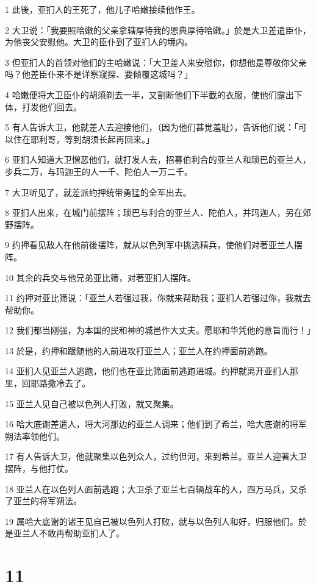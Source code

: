 \par 1 此後，亚扪人的王死了，他儿子哈嫩接续他作王。
\par 2 大卫说：「我要照哈嫩的父亲拿辖厚待我的恩典厚待哈嫩。」於是大卫差遣臣仆，为他丧父安慰他。大卫的臣仆到了亚扪人的境内。
\par 3 但亚扪人的首领对他们的主哈嫩说：「大卫差人来安慰你，你想他是尊敬你父亲吗？他差臣仆来不是详察窥探、要倾覆这城吗？」
\par 4 哈嫩便将大卫臣仆的胡须剃去一半，又割断他们下半截的衣服，使他们露出下体，打发他们回去。
\par 5 有人告诉大卫，他就差人去迎接他们，（因为他们甚觉羞耻），告诉他们说：「可以住在耶利哥，等到胡须长起再回来。」
\par 6 亚扪人知道大卫憎恶他们，就打发人去，招募伯利合的亚兰人和琐巴的亚兰人，步兵二万，与玛迦王的人一千、陀伯人一万二千。
\par 7 大卫听见了，就差派约押统带勇猛的全军出去。
\par 8 亚扪人出来，在城门前摆阵；琐巴与利合的亚兰人、陀伯人，并玛迦人，另在郊野摆阵。
\par 9 约押看见敌人在他前後摆阵，就从以色列军中挑选精兵，使他们对著亚兰人摆阵。
\par 10 其余的兵交与他兄弟亚比筛，对著亚扪人摆阵。
\par 11 约押对亚比筛说：「亚兰人若强过我，你就来帮助我；亚扪人若强过你，我就去帮助你。
\par 12 我们都当刚强，为本国的民和神的城邑作大丈夫。愿耶和华凭他的意旨而行！」
\par 13 於是，约押和跟随他的人前进攻打亚兰人；亚兰人在约押面前逃跑。
\par 14 亚扪人见亚兰人逃跑，他们也在亚比筛面前逃跑进城。约押就离开亚扪人那里，回耶路撒冷去了。
\par 15 亚兰人见自己被以色列人打败，就又聚集。
\par 16 哈大底谢差遣人，将大河那边的亚兰人调来；他们到了希兰，哈大底谢的将军朔法率领他们。
\par 17 有人告诉大卫，他就聚集以色列众人，过约但河，来到希兰。亚兰人迎著大卫摆阵，与他打仗。
\par 18 亚兰人在以色列人面前逃跑；大卫杀了亚兰七百辆战车的人，四万马兵，又杀了亚兰的将军朔法。
\par 19 属哈大底谢的诸王见自己被以色列人打败，就与以色列人和好，归服他们。於是亚兰人不敢再帮助亚扪人了。

\chapter{11}

